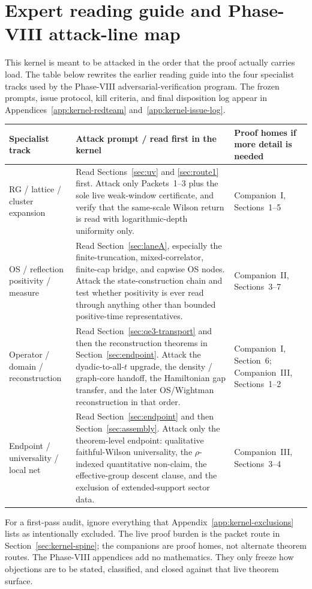 \section*{Expert reading guide and Phase-VIII attack-line map}

This kernel is meant to be attacked in the order that the proof actually carries load. The table below rewrites the earlier reading guide into the four specialist tracks used by the Phase-VIII adversarial-verification program. The frozen prompts, issue protocol, kill criteria, and final disposition log appear in Appendices~\ref{app:kernel-redteam} and~\ref{app:kernel-issue-log}.

\begin{center}
\small
\setlength{\tabcolsep}{4pt}
\renewcommand{\arraystretch}{1.08}
\begin{tabular}{@{}p{2.65cm}p{5.35cm}p{3.9cm}@{}}
\toprule
\textbf{Specialist track} & \textbf{Attack prompt / read first in the kernel} & \textbf{Proof homes if more detail is needed}\\
\midrule
RG / lattice / cluster expansion & Read Sections~\ref{sec:uv} and \ref{sec:route1} first. Attack only Packets~1--3 plus the sole live weak-window certificate, and verify that the same-scale Wilson return is read with logarithmic-depth uniformity only. & Companion~I, Sections~1--5\\
OS / reflection positivity / measure & Read Section~\ref{sec:laneA}, especially the finite-truncation, mixed-correlator, finite-cap bridge, and capwise OS nodes. Attack the state-construction chain and test whether positivity is ever read through anything other than bounded positive-time representatives. & Companion~II, Sections~3--7\\
Operator / domain / reconstruction & Read Section~\ref{sec:qe3-transport} and then the reconstruction theorems in Section~\ref{sec:endpoint}. Attack the dyadic-to-all-$t$ upgrade, the density / graph-core handoff, the Hamiltonian gap transfer, and the later OS/Wightman reconstruction in that order. & Companion~I, Section~6; Companion~III, Sections~1--2\\
Endpoint / universality / local net & Read Section~\ref{sec:endpoint} and then Section~\ref{sec:assembly}. Attack only the theorem-level endpoint: qualitative faithful-Wilson universality, the $\rho$-indexed quantitative non-claim, the effective-group descent clause, and the exclusion of extended-support sector data. & Companion~III, Sections~3--4\\
\bottomrule
\end{tabular}
\end{center}

For a first-pass audit, ignore everything that Appendix~\ref{app:kernel-exclusions} lists as intentionally excluded. The live proof burden is the packet route in Section~\ref{sec:kernel-spine}; the companions are proof homes, not alternate theorem routes. The Phase-VIII appendices add no mathematics. They only freeze how objections are to be stated, classified, and closed against that live theorem surface.
